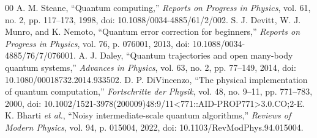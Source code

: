 \documentclass[conference]{../../../../Conference-LaTeX-template_10-17-19/IEEEtran}
\begin{document}
\begin{thebibliography}{00}
 A. M. Steane, ``Quantum computing,'' \emph{Reports on Progress in Physics}, vol. 61, no. 2, pp. 117--173, 1998, doi: 10.1088/0034-4885/61/2/002.
 S. J. Devitt, W. J. Munro, and K. Nemoto, ``Quantum error correction for beginners,'' \emph{Reports on Progress in Physics}, vol. 76, p. 076001, 2013, doi: 10.1088/0034-4885/76/7/076001.
 A. J. Daley, ``Quantum trajectories and open many-body quantum systems,'' \emph{Advances in Physics}, vol. 63, no. 2, pp. 77--149, 2014, doi: 10.1080/00018732.2014.933502.
 D. P. DiVincenzo, ``The physical implementation of quantum computation,'' \emph{Fortschritte der Physik}, vol. 48, no. 9--11, pp. 771--783, 2000, doi: 10.1002/1521-3978(200009)48:9/11<771::AID-PROP771>3.0.CO;2-E.
 K. Bharti \emph{et al.}, ``Noisy intermediate-scale quantum algorithms,'' \emph{Reviews of Modern Physics}, vol. 94, p. 015004, 2022, doi: 10.1103/RevModPhys.94.015004.
\end{thebibliography}
\end{document}
